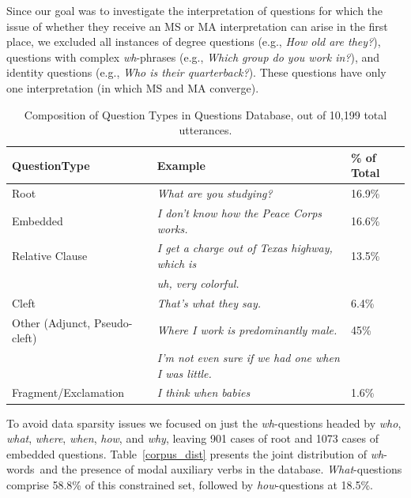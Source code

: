 \documentclass[12pt,letterpaper,table,svgnames,dvipsnames]{article}
\newcommand{\tableref}[1]{Table~\ref{#1}}
\newcommand{\whws}{\emph{wh}-words~}
\begin{document}
Since our goal was to investigate the interpretation of questions for which the issue of whether they receive an MS or MA interpretation can arise in the first place, we excluded all instances of degree questions (e.g., \emph{How old are they?}), questions with complex \emph{wh}-phrases (e.g., \emph{Which group do you work in?}), and identity questions (e.g., \emph{Who is their quarterback?}). These questions have only one interpretation (in which MS and MA converge).

\begin{table}[h!]
\begin{center} 
\caption{Composition of Question Types in Questions Database, out of 10,199 total utterances.} 
\label{total_dist} 
\begin{tabular}{lll} 
\toprule
\textbf{QuestionType}    &  \textbf{Example}                    & \textbf{\% of Total} \\
\midrule
Root            & \emph{What are you studying?}                     & 16.9\% \\
\midrule
Embedded        & \emph{I don't know how the Peace Corps works.}     & 16.6\%\\
\midrule
Relative Clause & \emph{I get a charge out of Texas highway, which is}   & 13.5\%\\
{}              & \emph{uh, very colorful.}                         & {}\\
\midrule
Cleft           & \emph{That's what they say.}                       & 6.4\% \\
\midrule
Other (Adjunct, Pseudo-cleft)           & \emph{Where I work is predominantly male.}          & 45\%\\
   {}           & \emph{I'm not even sure if we had one when I was little.}   & {} \\
\midrule
Fragment/Exclamation     & \emph{I think when babies}                        & 1.6\%\\
\bottomrule
\end{tabular} 
\end{center} 
\end{table}

To avoid data sparsity issues we focused on just the \emph{wh}-questions headed by \emph{who}, \emph{what}, \emph{where}, \emph{when}, \emph{how}, and \emph{why}, leaving 901 cases of root and 1073 cases of embedded questions. \tableref{corpus_dist} presents the joint distribution of \whws and the presence of modal auxiliary verbs in the database. \emph{What}-questions comprise 58.8\% of this constrained set, followed by \emph{how}-questions at 18.5\%. 
\end{document}
